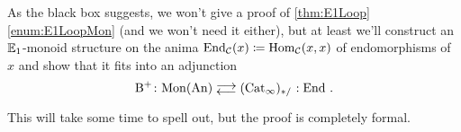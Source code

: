 As the black box suggests, we won't give a proof of \cref{thm:E1Loop}\cref{enum:E1LoopMon} (and we won't need it either), but at least we'll construct an $\mathbb{E}_1$-monoid structure on the anima $\operatorname{End}_{\mathcal{C}}(x)\coloneqq\operatorname{Hom}_{\mathcal{C}}(x,x)$ of endomorphisms of $x$ and show that it fits into an adjunction
\begin{equation*}
	\B^+\colon \cat{Mon}(\cat{An})\doublelrmorphism (\cat{Cat}_\infty)_{*/}\noloc \operatorname{End}\,.
\end{equation*}
This will take some time to spell out, but the proof is completely formal.
